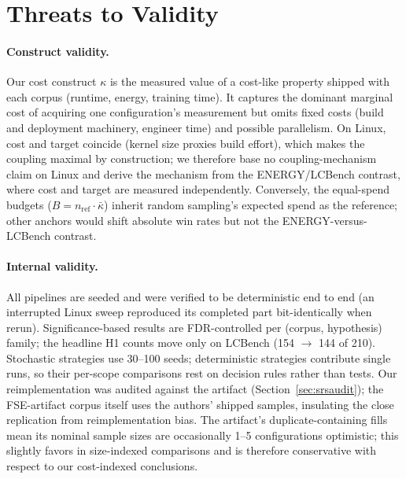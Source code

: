 \section{Threats to Validity}
\label{sec:threats}

\paragraph{Construct validity.} Our cost construct $\kappa$ is the
measured value of a cost-like property shipped with each corpus (runtime,
energy, training time). It captures the dominant marginal cost of
acquiring one configuration's measurement but omits fixed costs (build
and deployment machinery, engineer time) and possible parallelism. On
Linux, cost and target coincide (kernel size proxies build effort), which
makes the coupling maximal by construction; we therefore base no
coupling-mechanism claim on Linux and derive the mechanism from the
ENERGY/LCBench contrast, where cost and target are measured
independently. Conversely, the equal-spend budgets ($B = n_{\mathrm{ref}}
\cdot \bar\kappa$) inherit random sampling's expected spend as the
reference; other anchors would shift absolute win rates but not the
ENERGY-versus-LCBench contrast.

\paragraph{Internal validity.} All pipelines are seeded and were verified
to be deterministic end to end (an interrupted Linux sweep reproduced its
completed part bit-identically when rerun). Significance-based results
are FDR-controlled per (corpus, hypothesis) family; the headline H1
counts move only on LCBench (154 $\to$ 144 of 210). Stochastic strategies
use 30--100 seeds; deterministic strategies contribute single runs, so
their per-scope comparisons rest on decision rules rather than tests.
Our \srs{} reimplementation was audited against the artifact
(Section~\ref{sec:srsaudit}); the FSE-artifact corpus itself uses the
authors' shipped samples, insulating the close replication from
reimplementation bias. The artifact's duplicate-containing \srs{} fills
mean its nominal sample sizes are occasionally 1--5 configurations
optimistic; this slightly favors \srs{} in size-indexed comparisons and
is therefore conservative with respect to our cost-indexed conclusions.

